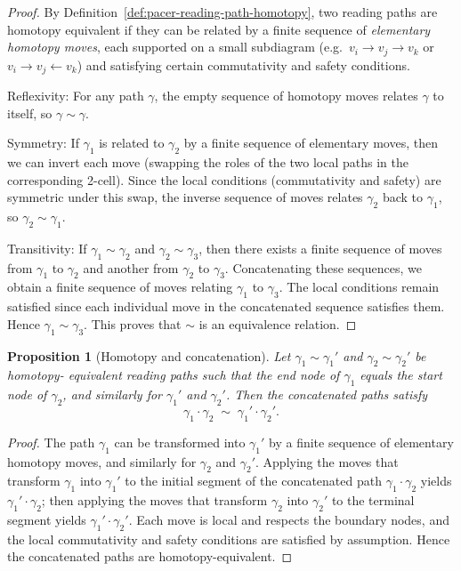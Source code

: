 \documentclass[11pt]{book}
\theoremstyle{plain}
\newtheorem{proposition}[theorem]{Proposition}
\theoremstyle{definition}
\theoremstyle{remark}
\begin{document}
\begin{proof}
By Definition~\ref{def:pacer-reading-path-homotopy}, two reading paths
are homotopy equivalent if they can be related by a finite sequence of
\emph{elementary homotopy moves}, each supported on a small subdiagram
(e.g.\ $v_i\to v_j\to v_k$ or $v_i\to v_j\leftarrow v_k$) and
satisfying certain commutativity and safety conditions.

Reflexivity: For any path $\gamma$, the empty sequence of homotopy
moves relates $\gamma$ to itself, so $\gamma\sim\gamma$.

Symmetry: If $\gamma_1$ is related to $\gamma_2$ by a finite sequence
of elementary moves, then we can invert each move (swapping the roles
of the two local paths in the corresponding 2-cell). Since the local
conditions (commutativity and safety) are symmetric under this swap,
the inverse sequence of moves relates $\gamma_2$ back to $\gamma_1$,
so $\gamma_2\sim\gamma_1$.

Transitivity: If $\gamma_1\sim\gamma_2$ and $\gamma_2\sim\gamma_3$,
then there exists a finite sequence of moves from $\gamma_1$ to
$\gamma_2$ and another from $\gamma_2$ to $\gamma_3$. Concatenating
these sequences, we obtain a finite sequence of moves relating
$\gamma_1$ to $\gamma_3$. The local conditions remain satisfied since
each individual move in the concatenated sequence satisfies them.
Hence $\gamma_1\sim\gamma_3$. This proves that $\sim$ is an
equivalence relation.
\end{proof}

\begin{proposition}[Homotopy and concatenation]
\label{prop:homotopy-concatenation}
Let $\gamma_1\sim\gamma_1'$ and $\gamma_2\sim\gamma_2'$ be homotopy-
equivalent reading paths such that the end node of $\gamma_1$ equals
the start node of $\gamma_2$, and similarly for $\gamma_1'$ and
$\gamma_2'$. Then the concatenated paths satisfy
\[
  \gamma_1\cdot\gamma_2 \;\sim\; \gamma_1'\cdot\gamma_2'.
\]
\end{proposition}

\begin{proof}
The path $\gamma_1$ can be transformed into $\gamma_1'$ by a finite
sequence of elementary homotopy moves, and similarly for $\gamma_2$
and $\gamma_2'$. Applying the moves that transform $\gamma_1$ into
$\gamma_1'$ to the initial segment of the concatenated path
$\gamma_1\cdot\gamma_2$ yields $\gamma_1'\cdot\gamma_2$; then applying
the moves that transform $\gamma_2$ into $\gamma_2'$ to the terminal
segment yields $\gamma_1'\cdot\gamma_2'$. Each move is local and
respects the boundary nodes, and the local commutativity and safety
conditions are satisfied by assumption. Hence the concatenated paths
are homotopy-equivalent.
\end{proof}
\end{document}
